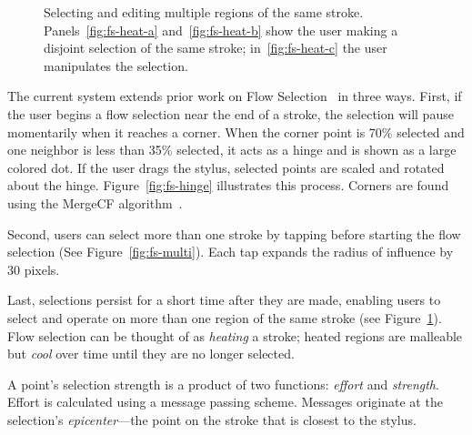 \documentclass{egpubl}
\begin{document}
\begin{figure}
  \centering {}
\caption{Selecting and editing multiple regions of the same
  stroke. Panels~\ref{fig:fs-heat-a} and~\ref{fig:fs-heat-b} show the
  user making a disjoint selection of the same stroke;
  in~\ref{fig:fs-heat-c} the user manipulates the selection.}
  \label{fig:fs-heat}
\end{figure}

The current system extends prior work on Flow
Selection~\cite{johnson-flow-selection} in three ways. First, if the
user begins a flow selection near the end of a stroke, the selection
will pause momentarily when it reaches a corner. When the corner point
is 70\% selected and one neighbor is less than 35\% selected, it acts
as a hinge and is shown as a large colored dot. If the user drags the
stylus, selected points are scaled and rotated about the
hinge. Figure~\ref{fig:fs-hinge} illustrates this process. Corners are
found using the MergeCF algorithm~\cite{wolin-smr}.

Second, users can select more than one stroke by tapping before
starting the flow selection (See Figure~\ref{fig:fs-multi}). Each tap
expands the radius of influence by 30 pixels.

Last, selections persist for a short time after they are made,
enabling users to select and operate on more than one region of the
same stroke (see Figure~\ref{fig:fs-heat}). Flow selection can be
thought of as \emph{heating} a stroke; heated regions are
malleable but \emph{cool} over time until they are no longer
selected.

A point's selection strength is a product of two functions:
\emph{effort} and \emph{strength}. Effort is calculated using a
message passing scheme. Messages originate at the selection's
\emph{epicenter}---the point on the stroke that is closest to the
stylus.
\end{document}
